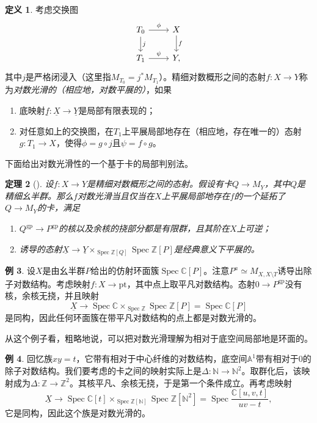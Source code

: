 \documentclass{amsart}
\newtheorem{thm}{定理}[section]
\theoremstyle{definition}
\newtheorem{defn}[thm]{定义}
\newtheorem{exm}[thm]{例}
\theoremstyle{remark}
\theoremstyle{plain}
\theoremstyle{definition}
\theoremstyle{remark}
\newcommand{\A}{\mathbb{A}}
\newcommand{\N}{\mathbb{N}}
\newcommand{\C}{\mathbb{C}}
\newcommand{\Z}{\mathbb{Z}}
\newcommand{\mr}[1]{\mathrm{#1}}
\newcommand{\ul}[1]{\underline{#1}}
\newcommand{\1}{\mathbf{1}}
\newcommand{\2}{\mathbf{2}}
\newcommand{\3}{\mathbf{3}}
\DeclareMathOperator{\Spec}{Spec}
\begin{document}
\begin{defn}
    考虑交换图
    \begin{equation*}
    \begin{tikzcd}
        T_0 \ar{r}{\phi} \ar{d}{j} & X \ar{d}{f} \\
        T_1 \ar{r}{\psi} & Y,
    \end{tikzcd}
    \end{equation*}
    其中\(j\)是严格闭浸入（这里指\(M_{T_0} = j^* M_{T_1}\)）。精细对数概形之间的态射\(f \colon X \to Y\)称为\textit{对数光滑的（相应地，对数平展的）}，如果
    \begin{enumerate}
        \item 底映射\(\ul{f} \colon \ul{X} \to \ul{Y}\)是局部有限表现的；
        \item 对任意如上的交换图，在\(T_1\)上平展局部地存在（相应地，存在唯一的）态射\(g \colon T_1 \to X\)，使得\(\phi = g \circ j\)且\(\psi = f \circ g\)。
    \end{enumerate}
\end{defn}

下面给出对数光滑性的一个基于卡的局部判别法。

\begin{thm}[{\cite[定理~3.5]{Kato1989}}]
    设\(f \colon X \to Y\)是精细对数概形之间的态射。假设有卡\(Q \to M_Y\)，其中\(Q\)是精细幺半群。那么\(f\)对数光滑当且仅当在\(X\)上平展局部地存在\(f\)的一个延拓了\(Q \to M_Y\)的卡，满足
    \begin{enumerate}
        \item \(Q^{\mr{gp}} \to P^{\mr{gp}}\)的核以及余核的挠部分都是有限群，且其阶在\(X\)上可逆；
        \item 诱导的态射\(\ul{X} \to \ul{Y} \times_{\Spec \Z[Q]} \Spec \Z[P]\)是经典意义下平展的。
    \end{enumerate}
\end{thm}

\begin{exm}
    设\(X\)是由幺半群\(P\)给出的仿射环面簇\(\Spec \C[P]\)。注意\(P^a \simeq M_{X, X \setminus T}\)诱导出除子对数结构。考虑映射\(f \colon X \to \mr{pt}\)，其中点上取平凡对数结构。态射\(0 \to P^{\mr{gp}}\)没有核，余核无挠，并且映射
    \[ \ul{X} \to \Spec \C \times_{\Spec \Z} \Spec \Z[P] = \Spec \C[P] \]
    是同构，因此任何环面簇在带平凡对数结构的点上都是对数光滑的。
\end{exm}

从这个例子看，粗略地说，可以把对数光滑理解为相对于底空间局部地是环面的。

\begin{exm}
    回忆族\(xy = t\)，它带有相对于中心纤维的对数结构，底空间\(\A^1\)带有相对于\(0\)的除子对数结构。我们要考虑的卡之间的映射实际上是\(\Delta \colon \N \to \N^2\)。取群化后，该映射成为\(\Delta \colon \Z \to \Z^2\)。其核平凡、余核无挠，于是第一个条件成立。再考虑映射
    \[ \ul{X} \to \Spec \C[t] \times_{\Spec \Z[\N]} \Spec \Z[\N^2] = \Spec \frac{\C[u,v,t]}{uv-t}, \]
    它是同构，因此这个族是对数光滑的。
\end{exm}
\end{document}
